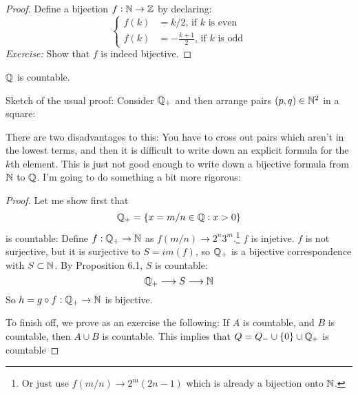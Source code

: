 \documentclass[twoside]{scrartcl}
\begin{document}
\begin{proof}
Define a bijection $f: \mathbb{N} \to \mathbb{Z}$ by declaring: \[\begin{cases}
f(k) &= k/2 \mbox{, if $k$ is even}\\
f(k) &= -\frac{k+1}{2} \mbox{, if $k$ is odd}	
\end{cases}
\]
\emph{Exercise:} Show that $f$ is indeed bijective. 
\end{proof}\vspace*{5pt}
	
\begin{proposition}
$\mathbb{Q}$ is countable.	
\end{proposition}

Sketch of the usual proof: Consider $\mathbb{Q}_+$ and then arrange pairs $(p,q) \in\mathbb{N}^2$ in a square: 
 
 \begin{center}
  \end{center} 
  
 There are two disadvantages to this: You have to cross out pairs which aren't in the lowest terms, and then it is difficult to write down an explicit formula for the $k$th element. This is just not good enough to write down a bijective formula from $\mathbb{N}$ to $\mathbb{Q}$. I'm going to do something a bit more rigorous: 
 


\begin{proof}
Let me show first that 
\[\mathbb{Q}_{+} = \{ x = m/n \in \mathbb{Q}: x > 0\}\]	
is countable: Define $f: \mathbb{Q}_+ \to \mathbb{N}$ as $f(m/n) \to 2^n3^m$.\footnote{Or just use $f(m/n) \to 2^{m}(2n-1)$ which is already a bijection onto $\mathbb{N}$.} $f$ is injetive. $f$ is not surjective, but it is surjective to $S = im(f)$, so $\mathbb{Q}_+$ is a bijective correspondence with $S \subset \mathbb{N}$. By Proposition 6.1, $S$ is countable: 
\[\mathbb{Q}_+ \longrightarrow S \longrightarrow \mathbb{N}\]
So $h = g \circ f: \mathbb{Q}_+ \to \mathbb{N}$ is bijective. 

To finish off, we prove as an exercise the following: If $A$ is countable, and $B$ is countable, then $A \cup B$ is countable. This implies that $Q = Q_- \cup \{0\} \cup \mathbb{Q}_+$ is countable
\end{proof}
\end{document}
